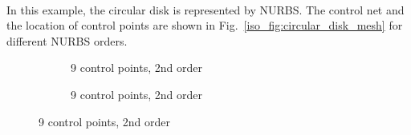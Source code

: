 \paragraph{}
In this example, the circular disk is represented by NURBS.
The control net and the location of control points are shown in Fig.~\ref{iso_fig:circular_disk_mesh} for different NURBS orders.
    \begin{figure}
        \begin{subfigure}[b]{0.5\linewidth}
            \centering
            \caption{9 control points, 2nd order}
        \end{subfigure}
        \begin{subfigure}[b]{0.5\linewidth}
            \centering
            \caption{9 control points, 2nd order}
        \end{subfigure}


\end{figure}
